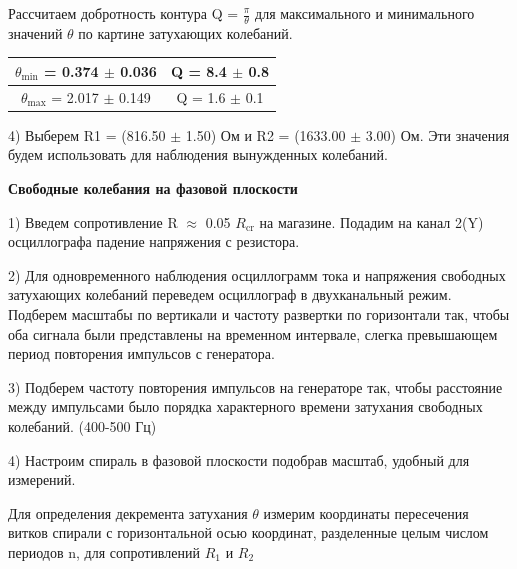 \documentclass[a4paper,12pt]{article}
\begin{document}
\par Рассчитаем добротность контура Q = $\frac{\pi}{\theta}$ для максимального и минимального значений $\theta$ по картине затухающих колебаний. 

\begin{center}
\begin{tabular}{|c|c|}
	\hline
	$\theta_{\text{min}}$ = 0.374 $\pm$ 0.036 & Q = 8.4 $\pm$ 0.8 \\
	\hline
	$\theta_{\text{max}}$ = 2.017 $\pm$ 0.149 & Q = 1.6 $\pm$ 0.1 \\
	\hline
\end{tabular}
\end{center}

\par 4) Выберем R1 = (816.50 $\pm$ 1.50) Ом и R2 = (1633.00 $\pm$ 3.00) Ом. Эти значения будем использовать для наблюдения вынужденных колебаний. 

\par \textbf{Свободные колебания на фазовой плоскости}

\par 1) Введем сопротивление R $\approx$ 0.05 $R_{\text{cr}}$ на магазине. Подадим на канал 2(Y) осциллографа падение напряжения с резистора. \\

\par 2) Для одновременного наблюдения осциллограмм тока и напряжения свободных затухающих колебаний переведем осциллограф в двухканальный режим. Подберем масштабы по вертикали и частоту развертки по горизонтали так, чтобы оба сигнала были представлены на временном интервале, слегка превышающем период повторения импульсов с генератора. \\

\par 3) Подберем частоту повторения импульсов на генераторе так, чтобы расстояние между импульсами было порядка характерного времени затухания свободных колебаний. (400-500 Гц) \\

\par 4) Настроим спираль в фазовой плоскости подобрав масштаб, удобный для измерений. \\

\par Для определения декремента затухания $\theta$ измерим координаты пересечения витков спирали с горизонтальной осью координат, разделенные целым числом периодов n, для сопротивлений $R_1$ и $R_2$\\ 
\end{document}
